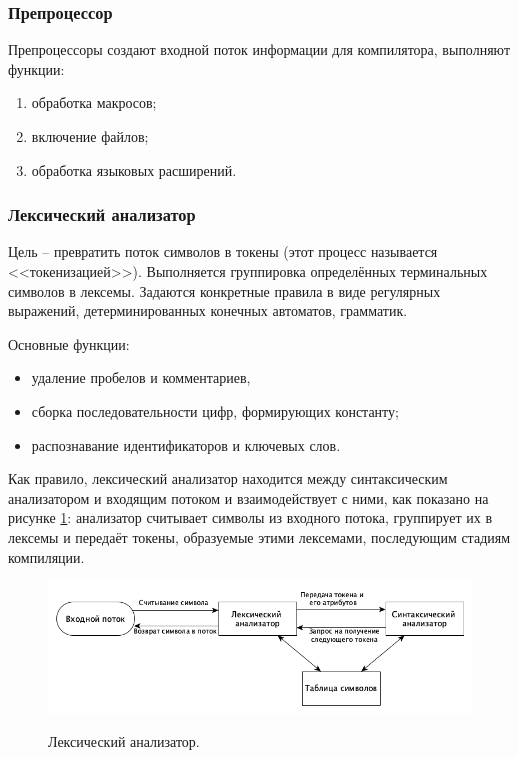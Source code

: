 \pagebreak

\subsubsection{Препроцессор}
Препроцессоры создают входной поток информации для компилятора, выполняют функции:
\begin{enumerate}
	\item обработка макросов;
	
	\item включение файлов;
	
	\item обработка языковых расширений. \\
\end{enumerate}

\subsubsection{Лексический анализатор}
Цель -- превратить поток символов в токены (этот процесс называется <<токенизацией>>). Выполняется группировка определённых терминальных символов в лексемы. Задаются конкретные правила в виде регулярных выражений, детерминированных конечных автоматов, грамматик. 

Основные функции:
\begin{itemize}
	\item удаление пробелов и комментариев, 
	
	\item сборка последовательности цифр, формирующих константу;
	
	\item распознавание идентификаторов и ключевых слов.
\end{itemize}

Как правило, лексический анализатор находится между синтаксическим анализатором и входящим потоком и взаимодействует с ними, как показано на рисунке \ref{fig:lexer}: анализатор считывает символы из входного потока, группирует их в лексемы и передаёт токены, образуемые этими лексемами, последующим стадиям компиляции.

\begin{figure}[h!]
	\begin{center}
		{\includegraphics[scale = 0.55, page=1]{img/lexer.png}}
		\caption{Лексический анализатор.}
		\label{fig:lexer}
	\end{center}
\end{figure}

